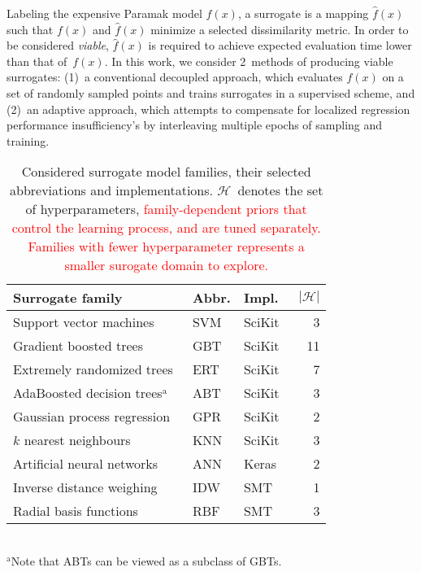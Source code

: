 Labeling the expensive Paramak model $f(x)$, a surrogate is a mapping
$\hat{f}(x)$ such that $f(x)$ and $\hat{f}(x)$ minimize a selected dissimilarity
metric. In order to be considered \textit{viable}, $\hat{f}(x)$ is required to
achieve expected evaluation time lower than that of~$f(x)$. In this work, we
consider 2~methods of producing viable surrogates: (1)~a conventional decoupled
approach, which evaluates $f(x)$ on a set of randomly sampled points and
trains surrogates in a supervised scheme, and (2)~an adaptive approach, which attempts to
compensate for localized regression performance insufficiency's by interleaving
multiple epochs of sampling and training.

\begin{table}[t]
	\setlength\tabcolsep{1pt}
	\renewcommand{\arraystretch}{0.95}
	\caption{\label{tbl:surrogates}Considered surrogate model families, their
		selected abbreviations and implementations. $\mathcal{H}$~denotes the
		set of hyperparameters, \textcolor{red}{family-dependent priors that control the
		learning process, and are tuned separately. Families with fewer
		hyperparameter represents a smaller surogate domain to explore.}}
	\begin{indented}
	\item[]
		\begin{tabular}{lllr}
		\toprule
		Surrogate family & Abbr. & Impl. & $|\mathcal{H}|$ \\
		\midrule
		Support vector machines~\cite{fan2008liblinear}	& SVM & SciKit~\cite{scikit-learn} & 3 \\
		Gradient boosted trees~\cite{friedman2001greedy,friedman1999stochastic,hastie2009elements}	& GBT & SciKit & 11 \\
		Extremely randomized trees~\cite{geurts2006extremely}	& ERT & SciKit & 7 \\
		AdaBoosted decision trees$^\text{a}$~\cite{drucker1997improving}	& ABT & SciKit & 3 \\
		Gaussian process regression~\cite{williams2006gaussian}	& GPR & SciKit & 2 \\
		$k$ nearest neighbours	& KNN & SciKit & 3 \\
		Artificial neural networks	& ANN & Keras~\cite{chollet2015keras} & 2 \\
		Inverse distance weighing~\cite{shepard1968two} & IDW & SMT~\cite{SMT2019} & 1 \\
		Radial basis functions & RBF & SMT & 3 \\
		\bottomrule
		\end{tabular}\\%
		{\footnotesize $^\text{a}$Note that ABTs can be viewed as a subclass of GBTs.}
	\end{indented}
\end{table}

